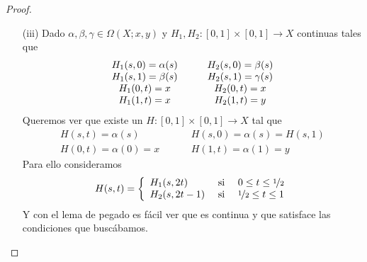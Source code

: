 \begin{lema}
\begin{proof}
\begin{enumerate}
            \item[(iii)] Dado $\alpha, \beta, \gamma\in \Omega(X;x,y)$ y $H_1,H_2:[0,1]\times[0,1]\to X$ continuas tales que 
            \begin{gather*}
                \begin{array}{c c c c}
                    H_1(s,0) = \alpha(s) &&& H_2(s,0) = \beta(s)\\
                    H_1(s,1) = \beta(s) &&& H_2(s,1) = \gamma(s)\\
                    H_1(0,t) = x &&& H_2(0,t) = x\\
                    H_1(1, t) = x &&& H_2(1,t) = y
                \end{array}
            \end{gather*}
            Queremos ver que existe un $H:[0,1]\times [0,1]\to X$ tal que 
            \begin{align*}
                H(s,t) = \alpha(s) \hspace{1cm} & H(s,0) = \alpha(s)=H(s,1)\\
                H(0,t) = \alpha(0)=x \hspace{1cm} & H(1,t) = \alpha(1) = y
            \end{align*}
            Para ello consideramos 
            \begin{gather*}
                H(s,t) = \left\{
                    \begin{array}{l c c}
                        H_1(s,2t) & \text{ si } & 0 \leq t \leq \nicefrac{1}{2}\\
                        H_2(s, 2t-1) & \text{ si } & \nicefrac{1}{2} \leq t \leq 1
                    \end{array}
                \right.
            \end{gather*}
            Y con el lema de pegado es fácil ver que es continua y que satisface las condiciones que buscábamos.
        \end{enumerate}
    \end{proof}
\end{lema}


